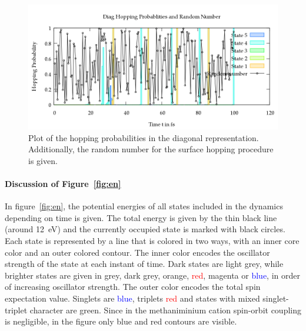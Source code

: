 \documentclass[a4paper,11pt,DIV=15,openany]{scrbook}
\begin{document}
\begin{figure}[tb]
  \centering
  \includegraphics[width=\textwidth]{figures/prob.png}
  \caption{Plot of the hopping probabilities in the diagonal representation. Additionally, the random number for the surface hopping procedure is given.}
  \label{fig:prob}
\end{figure}

\paragraph{Discussion of Figure~\ref{fig:en}}

In figure~\ref{fig:en}, the potential energies of all states included in the dynamics depending on time is given. 
The total energy is given by the thin black line (around 12~eV) and the currently occupied state is marked with black circles. 
Each state is represented by a line that is colored in two ways, with an inner core color and an outer colored contour.
The inner color encodes the oscillator strength of the state at each instant of time. 
Dark states are \textcolor{black!20}{light grey}, while brighter states are given in \textcolor{black!40}{grey}, \textcolor{black!70}{dark grey}, \textcolor{red!60!green}{orange}, \textcolor{red}{red}, \textcolor{red!50!blue}{magenta} or \textcolor{blue}{blue}, in order of increasing oscillator strength. 
The outer color encodes the total spin expectation value. 
Singlets are \textcolor{blue}{blue}, triplets \textcolor{red}{red} and states with mixed singlet-triplet character are \textcolor{green!90!black}{green}. 
Since in the methaniminium cation spin-orbit coupling is negligible, in the figure only blue and red contours are visible.
\end{document}
